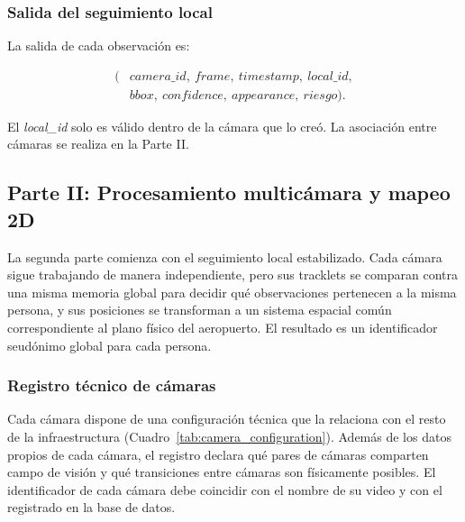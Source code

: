 \documentclass[12pt,a4paper]{article}
\begin{document}
\subsubsection{Salida del seguimiento local}

La salida de cada observación es:

\begin{equation}
\begin{aligned}
(&camera\_id,\ frame,\ timestamp,\ local\_id,\\
&bbox,\ confidence,\ appearance,\ riesgo).
\end{aligned}
\end{equation}

El \textit{local\_id} solo es válido dentro de la cámara que lo creó. La
asociación entre cámaras se realiza en la Parte II.

\subsection{Parte II: Procesamiento multicámara y mapeo 2D}

La segunda parte comienza con el seguimiento local estabilizado. Cada
cámara sigue trabajando de manera independiente, pero sus tracklets se
comparan contra una misma memoria global para decidir qué observaciones
pertenecen a la misma persona, y sus posiciones se transforman a un
sistema espacial común correspondiente al plano físico del aeropuerto.
El resultado es un identificador seudónimo global para cada persona.

\subsubsection{Registro técnico de cámaras}

Cada cámara dispone de una configuración técnica que la relaciona con el
resto de la infraestructura (Cuadro~\ref{tab:camera_configuration}).
Además de los datos propios de cada cámara, el registro declara qué pares
de cámaras comparten campo de visión y qué transiciones entre cámaras son
físicamente posibles. El identificador de cada cámara debe coincidir con
el nombre de su video y con el registrado en la base de datos.
\end{document}
